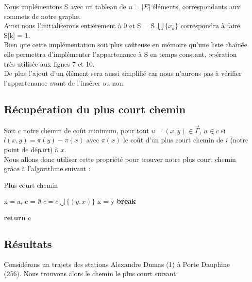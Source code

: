 \documentclass{article}
\begin{document}
Nous implémentons S avec un tableau de $n = \vert E\vert$ éléments, correspondants aux sommets 
de notre graphe.\\
Ainsi nous l'initialiserons entièrement à 0 et S = S $\bigcup \{x_k\}$
correspondra à faire S[k] = 1.\\
Bien que cette implémentation soit plus coûteuse en mémoire qu'une liste chaînée
elle permettra d'implémenter l'appartenance à S en temps constant, opération très
utilisée aux lignes 7 et 10.\\
De plus l'ajout d'un élément sera aussi simplifié car nous n'aurons pas à vérifier
l'appartenance avant de l'insérer ou non.\\

\subsection{Récupération du plus court chemin}


Soit $c$ notre chemin de coût minimum, pour tout $u = (x,y) \in \vec{\Gamma}$, $ u \in c$ si 
$l(x,y) = \pi (y) - \pi (x)$ avec $\pi(x)$ le coût d'un plus court chemin de $i$ (notre point de départ)
à $x$.\\

Nous allons donc utiliser cette propriété pour trouver notre plus court chemin grâce à
l'algorithme suivant :\\

\clearpage


\begin{algorithm}
\caption{Plus court chemin}\label{pcc}
\begin{algorithmic}[1]
	\State x = a, c = $\emptyset$
				\State $c = c \bigcup \{(y,x)\}$
				\State x = y
				\State \textbf{break}
			\EndIf
		\EndFor
	\EndWhile
	
	\State \textbf{return} c
\EndProcedure
\end{algorithmic}
\end{algorithm}

\subsection{Résultats}

Considérons un trajets des stations Alexandre Dumas (1) à Porte Dauphine (256).
Nous trouvons alors le chemin le plus court suivant:\\
\end{document}
